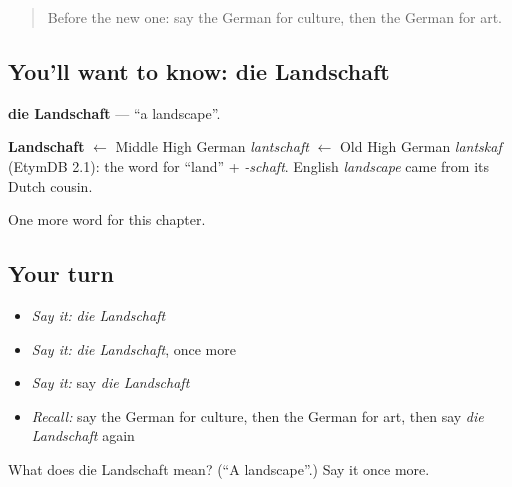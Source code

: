 \begin{quote}
Before the new one: say the German for culture, then the German for art.
\end{quote}

\subsection*{You'll want to know: die Landschaft}
\textbf{die Landschaft} — \textquotedblleft{}a landscape\textquotedblright{}.

\begin{cousinweb}
\textbf{Landschaft} $\leftarrow$ Middle High German \emph{lantschaft} $\leftarrow$ Old High German \emph{lantskaf} (EtymDB 2.1): the word for \textquotedblleft{}land\textquotedblright{} + \emph{-schaft}. English \emph{landscape} came from its Dutch cousin.
\end{cousinweb}

\begin{grammarlens}[title={What you've built}]
One more word for this chapter.
\end{grammarlens}

\subsection*{Your turn}
\begin{itemize}
\raggedright
  \item \emph{Say it:} \emph{die Landschaft}
  \item \emph{Say it:} \emph{die Landschaft}, once more
  \item \emph{Say it:} say \emph{die Landschaft}
  \item \emph{Recall:} say the German for culture, then the German for art, then say \emph{die Landschaft} again
\end{itemize}

\begin{tcolorbox}[breakable,colback=teal!4,colframe=teal!35!black,title={Before you move on}]
What does die Landschaft mean? (\textquotedblleft{}A landscape\textquotedblright{}.) Say it once more.
\end{tcolorbox}
